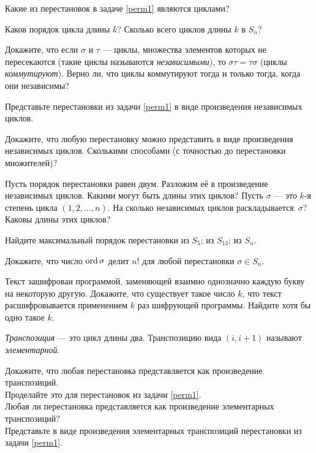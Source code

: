 \documentclass[a4paper, 11pt]{article}
\begin{document}
Какие из перестановок в задаче \ref{perm1} являются циклами?

Каков порядок цикла длины $k$?
Сколько всего циклов длины $k$ в $S_n$?



Докажите, что если $\sigma$ и $\tau$ --- циклы, множества
элементов которых не пересекаются (такие циклы называются
\emph{независимыми}), то $\sigma\tau=\tau\sigma$ (циклы
\emph{коммутируют}).
Верно ли, что циклы коммутируют тогда и только тогда, когда они
независимы?

Представьте перестановки из задачи \ref{perm1} в виде произведения
независимых циклов.


Докажите, что любую перестановку  можно представить в виде
произведения независимых циклов.
Сколькими способами (с точностью до перестановки множителей)?



Пусть порядок перестановки равен двум. Разложим её в произведение
независимых циклов. Какими могут быть длины этих циклов?
Пусть $\sigma$ --- это $k$-я степень цикла $(1,2,\dots,n)$.
На сколько независимых циклов раскладывается~$\sigma$?
Каковы длины этих циклов?


Найдите максимальный порядок перестановки
 из $S_5$;
 из $S_{13}$;
 из $S_n$.


Докажите, что число $\operatorname{ord}\sigma$ делит $n!$ для любой перестановки
$\sigma\in S_n$.


Текст зашифрован программой, заменяющей взаимно однозначно каждую
букву на некоторую другую.
Докажите, что существует такое число $k$, что текст
расшифровывается применением $k$ раз шифрующей программы.
Найдите хотя бы одно такое $k$.


\newpage


\emph{Транспозиция} --- это цикл длины два. Транспозицию вида
$(i,i+1)$ называют \emph{элементарной}.

Докажите, что любая перестановка %
представляется как произведение транспозиций.\\
Проделайте это для перестановок из задачи \ref{perm1}.  \\
Любая ли перестановка %
представляется как
произведение элементарных транспозиций?\\
Представьте в виде произведения элементарных транспозиций
перестановки из задачи \ref{perm1}.
\end{document}
